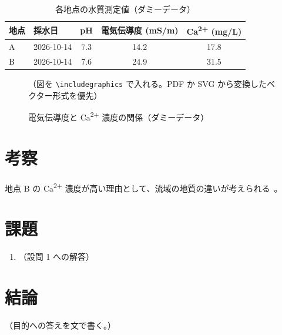 \documentclass[lualatex, paper=a4paper, fontsize=10.5pt, jafontsize=10.5pt,
  baselineskip=19.5pt, line_length=160mm, head_space=25mm, foot_space=25mm]{jlreq}
\begin{document}
\begin{table}[htbp]
  \centering
  \caption{各地点の水質測定値（ダミーデータ）}\label{tab:water}
  \begin{tabular}{l l S[table-format=1.1] S[table-format=2.1] S[table-format=2.1]}
    \toprule
    地点 & 採水日 & {pH} & {電気伝導度 (\si{mS/m})} & {Ca\textsuperscript{2+} (\si{mg/L})} \\
    \midrule
    A & 2026-10-14 & 7.3 & 14.2 & 17.8 \\
    B & 2026-10-14 & 7.6 & 24.9 & 31.5 \\
    \bottomrule
  \end{tabular}
\end{table}

\begin{figure}[htbp]
  \centering
  \parbox[c][40mm][c]{120mm}{\centering\textcolor{rs1inkmuted}{（図を \texttt{\textbackslash includegraphics} で入れる。PDF か SVG から変換したベクター形式を優先）}}
  \caption{電気伝導度と Ca\textsuperscript{2+} 濃度の関係（ダミーデータ）}\label{fig:ec}
\end{figure}

\section{考察}
地点 B の Ca\textsuperscript{2+} 濃度が高い理由として、流域の地質の違いが考えられる~\cite{example2020,example2025}。


\section{課題}
\begin{enumerate}
  \item （設問 1 への解答）
\end{enumerate}

\section{結論}
（目的への答えを文で書く。）

\nocite{*}   %
\printbibliography[title=参考文献]
\end{document}
